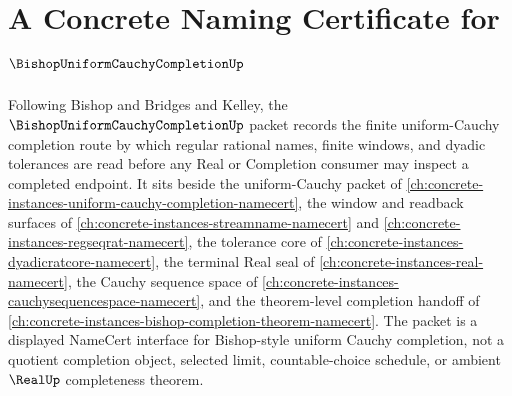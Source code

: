 \chapter{A Concrete Naming Certificate for $\BishopUniformCauchyCompletionUp$}
\label{ch:concrete-instances-bishop-uniform-cauchy-completion-namecert}

Following Bishop and Bridges and Kelley, the $\BishopUniformCauchyCompletionUp$ packet records the finite uniform-Cauchy completion route by which regular rational names, finite windows, and dyadic tolerances are read before any Real or Completion consumer may inspect a completed endpoint. It sits beside the uniform-Cauchy packet of \autoref{ch:concrete-instances-uniform-cauchy-completion-namecert}, the window and readback surfaces of \autoref{ch:concrete-instances-streamname-namecert} and \autoref{ch:concrete-instances-regseqrat-namecert}, the tolerance core of \autoref{ch:concrete-instances-dyadicratcore-namecert}, the terminal Real seal of \autoref{ch:concrete-instances-real-namecert}, the Cauchy sequence space of \autoref{ch:concrete-instances-cauchysequencespace-namecert}, and the theorem-level completion handoff of \autoref{ch:concrete-instances-bishop-completion-theorem-namecert}. The packet is a displayed NameCert interface for Bishop-style uniform Cauchy completion, not a quotient completion object, selected limit, countable-choice schedule, or ambient $\RealUp$ completeness theorem.

